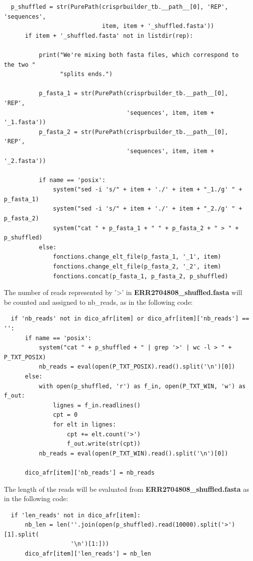 \documentclass[twoside,a4paper,11pt,frenchb,openany]{report}
\begin{document}
\begin{verbatim}
  p_shuffled = str(PurePath(crisprbuilder_tb.__path__[0], 'REP', 'sequences',
                            item, item + '_shuffled.fasta'))
      if item + '_shuffled.fasta' not in listdir(rep):

          print("We're mixing both fasta files, which correspond to the two "
                "splits ends.")

          p_fasta_1 = str(PurePath(crisprbuilder_tb.__path__[0], 'REP',
                                   'sequences', item, item + '_1.fasta'))
          p_fasta_2 = str(PurePath(crisprbuilder_tb.__path__[0], 'REP',
                                   'sequences', item, item + '_2.fasta'))

          if name == 'posix':
              system("sed -i 's/" + item + './' + item + "_1./g' " + p_fasta_1)
              system("sed -i 's/" + item + './' + item + "_2./g' " + p_fasta_2)
              system("cat " + p_fasta_1 + " " + p_fasta_2 + " > " + p_shuffled)
          else:
              fonctions.change_elt_file(p_fasta_1, '_1', item)
              fonctions.change_elt_file(p_fasta_2, '_2', item)
              fonctions.concat(p_fasta_1, p_fasta_2, p_shuffled)
\end{verbatim}

    The number of reads represented by '\textgreater{}' in
\textbf{ERR2704808\_shuffled.fasta} will be counted and assigned to nb\_reads, as
in the following code:

\begin{verbatim}
  if 'nb_reads' not in dico_afr[item] or dico_afr[item]['nb_reads'] == '':
      if name == 'posix':
          system("cat " + p_shuffled + " | grep '>' | wc -l > " + P_TXT_POSIX)
          nb_reads = eval(open(P_TXT_POSIX).read().split('\n')[0])
      else:
          with open(p_shuffled, 'r') as f_in, open(P_TXT_WIN, 'w') as f_out:
              lignes = f_in.readlines()
              cpt = 0
              for elt in lignes:
                  cpt += elt.count('>')
                  f_out.write(str(cpt))
          nb_reads = eval(open(P_TXT_WIN).read().split('\n')[0])

      dico_afr[item]['nb_reads'] = nb_reads
\end{verbatim}

    The length of the reads will be evaluated from
\textbf{ERR2704808\_shuffled.fasta} as in the following code:

\begin{verbatim}
  if 'len_reads' not in dico_afr[item]:
      nb_len = len(''.join(open(p_shuffled).read(10000).split('>')[1].split(
                   '\n')[1:]))
      dico_afr[item]['len_reads'] = nb_len
\end{verbatim}
\end{document}
